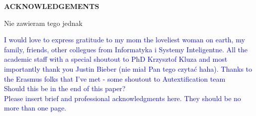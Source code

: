 


\begin{center}

\end{center}
\begin{center}

{\bf\fontsize{14pt}{14.5pt}\selectfont \uppercase{Acknowledgements}}\\\vspace{1cm}
\end{center}



Nie zawieram tego jednak

\textcolor{blue}{I would love to express gratitude to my mom the loveliest woman on earth, my family, friends, other collegues from Informatyka i Systemy Inteligentne. All the academic staff with a special shoutout to PhD Krzysztof Kluza and most importantly thank you Justin Bieber (nie miał Pan tego czytać haha).
Thanks to the Erasmus folks that I've met - some shoutout to Autextification team  \\
Should this be in the end of this paper? \\ 
Please insert brief and professional acknowledgments here. They should be no more than one page.}


